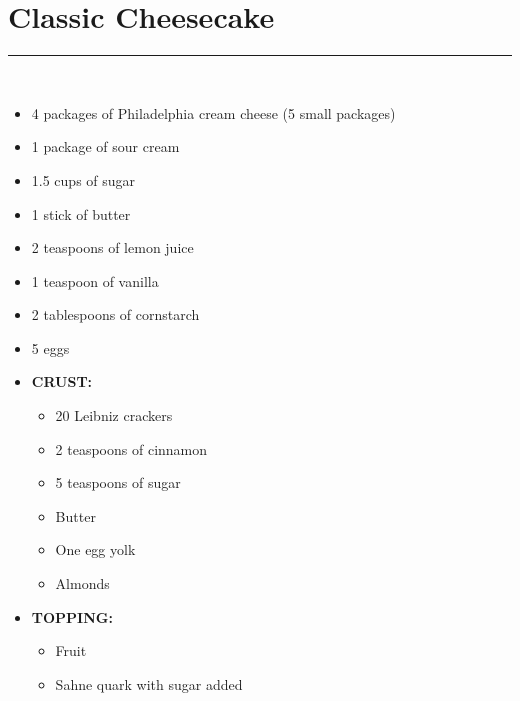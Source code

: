 \documentclass[12pt]{article}
\def \hzline{\noindent \rule[0mm]{\textwidth}{1pt}}
\begin{document}
\newpage
\section*{Classic Cheesecake} \hzline \\
\begin{itemize}
  \item 4 packages of Philadelphia cream cheese  (5 small packages)
  \item 1 package of sour cream
  \item 1.5 cups of sugar
  \item 1 stick of butter
  \item 2 teaspoons of lemon juice
  \item 1 teaspoon of vanilla
  \item 2 tablespoons of cornstarch
  \item 5 eggs
  \item \textbf{CRUST:}
     \begin{itemize}
       \item 20 Leibniz crackers
       \item 2 teaspoons of cinnamon
       \item 5 teaspoons of sugar
       \item Butter
       \item One egg yolk
       \item Almonds
     \end{itemize}
   \item \textbf{TOPPING:}
     \begin{itemize}
       \item Fruit
       \item Sahne quark with sugar added
     \end{itemize}
\end{itemize}
\end{document}
